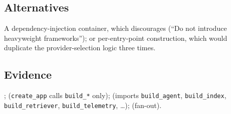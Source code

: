\subsection*{Alternatives}

A dependency-injection container, which  discourages (``Do
not introduce heavyweight frameworks''); or per-entry-point construction, which
would duplicate the provider-selection logic three times.

\subsection*{Evidence}

;
 (\texttt{create\_app} calls \texttt{build\_*} only);
 (imports \texttt{build\_agent}, \texttt{build\_index},
\texttt{build\_retriever}, \texttt{build\_telemetry}, \ldots);
 (fan-out).
